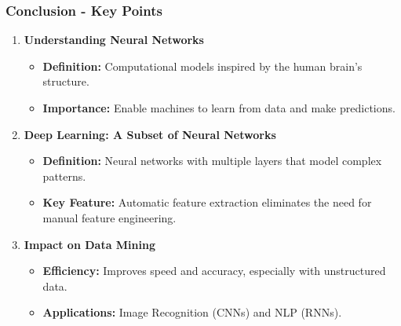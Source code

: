 \documentclass[aspectratio=169]{beamer}
\begin{document}
\begin{frame}[fragile]
    \frametitle{Conclusion - Key Points}
    \begin{enumerate}
        \item \textbf{Understanding Neural Networks}
            \begin{itemize}
                \item \textbf{Definition:} Computational models inspired by the human brain's structure.
                \item \textbf{Importance:} Enable machines to learn from data and make predictions.
            \end{itemize}
        
        \item \textbf{Deep Learning: A Subset of Neural Networks}
            \begin{itemize}
                \item \textbf{Definition:} Neural networks with multiple layers that model complex patterns.
                \item \textbf{Key Feature:} Automatic feature extraction eliminates the need for manual feature engineering.
            \end{itemize}
    
        \item \textbf{Impact on Data Mining}
            \begin{itemize}
                \item \textbf{Efficiency:} Improves speed and accuracy, especially with unstructured data.
                \item \textbf{Applications:} Image Recognition (CNNs) and NLP (RNNs).
            \end{itemize}
    \end{enumerate}
\end{frame}
\end{document}

